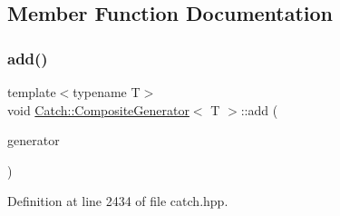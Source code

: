 \subsection{Member Function Documentation}
\hypertarget{class_catch_1_1_composite_generator_af3774d42ad2d3453d089ca599efe0517}{}\label{class_catch_1_1_composite_generator_af3774d42ad2d3453d089ca599efe0517} 
\subsubsection{\texorpdfstring{add()}{add()}}
{\footnotesize\ttfamily template$<$typename T$>$ \\
void \hyperlink{class_catch_1_1_composite_generator}{Catch\+::\+Composite\+Generator}$<$ T $>$\+::add (\begin{DoxyParamCaption}\item[{const \hyperlink{struct_catch_1_1_i_generator}{I\+Generator}$<$ T $>$ $\ast$}]{generator }\end{DoxyParamCaption})\hspace{0.3cm}{\ttfamily [inline]}}



Definition at line 2434 of file catch.\+hpp.

